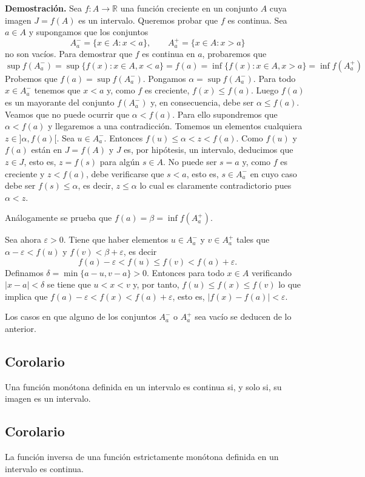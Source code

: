 \documentclass[10pt,a4paper]{article}
\begin{document}
	\textbf{Demostración. }Sea $f: A \rightarrow \mathbb{R}$ una función creciente en un conjunto $A$ cuya imagen $J = f(A)$ es un intervalo. Queremos probar que $f$ es continua. Sea $a \in A$ y supongamos que los conjuntos
	$$A_a ^- = \{x \in A : x < a\}, \qquad A_a^+ =\{x \in A: x > a\}$$
	no son vacíos. Para demostrar que $f$ es continua en $a$, probaremos que
	$$ \sup f(A_a^-) = \sup\{f(x):x \in A, x < a\} = f(a) = \inf\{f(x) : x \in A, x > a\} = \inf f(A_a^+)$$
	Probemos que $f(a) = \sup f(A_a^-)$. Pongamos $\alpha = \sup f(A_a^-)$. Para todo $x \in A_a^-$ tenemos que $x < a$ y, como $f$ es creciente, $f(x) \leq f(a)$. Luego $f(a)$ es un mayorante del conjunto $f(A_a^-)$ y, en consecuencia, debe ser $\alpha \leq f(a)$. Veamos que no puede ocurrir que $\alpha < f(a)$. Para ello supondremos que $\alpha < f(a)$ y llegaremos a una contradicción. Tomemos un elementos cualquiera $z \in ]\alpha, f(a)[$. Sea $u \in A_a^-$. Entonces $f(u) \leq \alpha < z < f(a)$. Como $f(u)$ y $f(a)$ están en $J = f(A)$ y $J$ es, por hipótesis, un intervalo, deducimos que $z \in J$, esto es, $z = f(s)$ para algún $s \in A$. No puede ser $s = a$ y, como $f$ es creciente y $z < f(a)$, debe verificarse que $s < a$, esto es, $s \in A_a^-$ en cuyo caso debe ser $f(s) \leq \alpha$, es decir, $z \leq \alpha$ lo cual es claramente contradictorio pues $\alpha < z$.
	
	Análogamente se prueba que $f(a) = \beta = \inf f(A_a^+)$.
	
	Sea ahora $\varepsilon > 0$. Tiene que haber elementos $u \in A_a^-$ y $v \in A_a^+$ tales que $\alpha - \varepsilon < f(u) $ y $f(v) < \beta + \varepsilon$, es decir
	$$f(a) - \varepsilon < f(u) \leq f(v) < f(a) + \varepsilon.$$
	Definamos $\delta = \min\{a - u, v -a\} > 0$. Entonces para todo $x \in A$ verificando $|x - a| < \delta$ se tiene que $u < x < v$ y, por tanto, $f(u) \leq f(x) \leq f(v)$ lo que implica que $f(a) - \varepsilon < f(x) < f(a) + \varepsilon$, esto es, $|f(x) - f(a)| < \varepsilon$.
	
	Los casos en que alguno de los conjuntos $A_a^-$ o $A_a^+$ sea vacío se deducen de lo anterior.
	
	\subsection{Corolario}
	Una función monótona definida en un intervalo es continua si, y solo si, su imagen es un intervalo.
	
	\subsection{Corolario}
	La función inversa de una función estrictamente monótona definida en un intervalo es continua.
	
\end{document}
